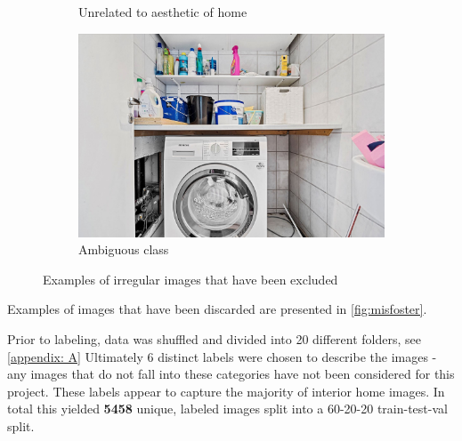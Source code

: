 \begin{figure}[H]
\begin{subfigure}[b]{0.4\textwidth}
      \caption{Unrelated to aesthetic of home}
      \label{fig:3}
    \end{subfigure}
    \begin{subfigure}[b]{0.4\textwidth}
      \includegraphics[width=\textwidth]{pictures/random/washer}
      \caption{Ambiguous class}
      \label{fig:4}
    \end{subfigure}
    \caption{Examples of irregular images that have been excluded}
    \label{fig:misfoster}
\end{figure}

Examples of images that have been discarded are presented in \autoref{fig:misfoster}.

Prior to labeling, data was shuffled and divided into 20 different folders, see \autoref{appendix: A}
Ultimately 6 distinct labels were chosen to describe the images - any images that do not fall into these categories have not been considered for this project.
These labels appear to capture the majority of interior home images. In total this yielded \textbf{5458} unique, labeled images split into a 60-20-20 train-test-val split.
\begin{table}[H]
    \caption{Labeled images from various danish real-estate pages}
    \label{tab:datadist}
\end{table}